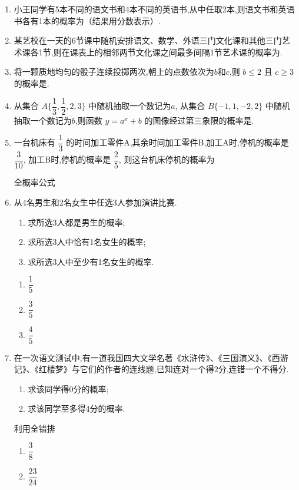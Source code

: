 \begin{enumerate}

\item 小王同学有5本不同的语文书和4本不同的英语书,从中任取2本,则语文书和英语书各有1本的概率为（结果用分数表示）.

\item 某艺校在一天的6节课中随机安排语文、数学、外语三门文化课和其他三门艺术课各1节,则在课表上的相邻两节文化课之间最多间隔1节艺术课的概率为.

\item 将一颗质地均匀的骰子连续投掷两次,朝上的点数依次为$b$和$c$,则 $b\le2$ 且 $c\ge3$ 的概率是.

\item 从集合 $A\{\dfrac{1}{3},\dfrac{1}{2},2,3\}$ 中随机抽取一个数记为$a$, 从集合 $B\{-1,1,-2,2\}$ 中随机抽取一个数记为$b$,则函数 $y=a^{x}+b$ 的图像经过第三象限的概率是.

\item 一台机床有 $\dfrac{1}{3}$ 的时间加工零件A,其余时间加工零件B,加工A时,停机的概率是 $\dfrac{3}{10}$, 加工B时,停机的概率是 $\dfrac{2}{5}$, 则这台机床停机的概率为
\begin{jieda}
    全概率公式
\end{jieda}

\item 从4名男生和2名女生中任选3人参加演讲比赛.
\begin{enumerate}
\item 求所选3人都是男生的概率;
\item 求所选3人中恰有1名女生的概率;
\item 求所选3人中至少有1名女生的概率.
\end{enumerate}
\begin{jieda}
    \begin{enumerate}
        \item $\dfrac{1}{5}$
        \item $\dfrac{3}{5}$
        \item $\dfrac{4}{5}$
    \end{enumerate}
\end{jieda}



\item 在一次语文测试中,有一道我国四大文学名著《水浒传》、《三国演义》、《西游记》、《红楼梦》与它们的作者的连线题,已知连对一个得2分,连错一个不得分.
\begin{enumerate}
\item 求该同学得0分的概率;
\item 求该同学至多得4分的概率.
\end{enumerate}
\begin{jieda}
利用全错排
    \begin{enumerate}
        \item $\dfrac{3}{8}$
        \item $\dfrac{23}{24}$
    \end{enumerate}
\end{jieda}


\end{enumerate}
